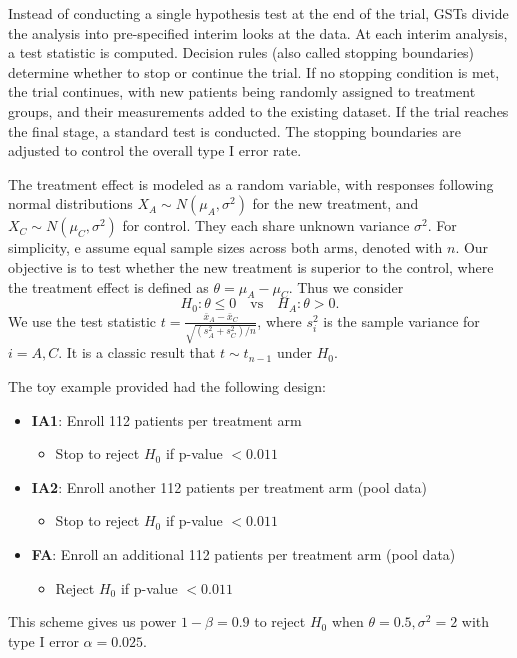 \documentclass[12pt,a4paper]{article}
\begin{document}
Instead of conducting a single hypothesis test at the end of the trial, GSTs divide the analysis into pre-specified interim looks at the data. At each interim analysis, a test statistic is computed. Decision rules (also called stopping boundaries) determine whether to stop or continue the trial. If no stopping condition is met, the trial continues, with new patients being randomly assigned to treatment groups, and their measurements added to the existing dataset. If the trial reaches the final stage, a standard test is conducted. The stopping boundaries are adjusted to control the overall type I error rate. %

The treatment effect is modeled as a random variable, with responses following normal distributions $X_A\sim N(\mu_A, \sigma^2)$ for the new treatment, and $ X_C\sim N(\mu_C, \sigma^2)$ for control. They each share unknown variance $\sigma^2$. For simplicity, e assume equal sample sizes across both arms, denoted with $n$. Our objective is to test whether the new treatment is superior to the control, where the treatment effect is defined as $\theta = \mu_A - \mu_C$. Thus we consider
$$H_0: \theta \leq 0 \quad \text{vs} \quad H_A:\theta > 0.$$  
We use the test statistic $t = \frac{\bar{x}_A - \bar{x}_C}{\sqrt{(s_A^2 + s_C^2)/n}}$, where $s_i^2$ is the sample variance for $i=A,C$. It is a classic result that $t\sim t_{n-1}$ under $H_0$. 

The toy example provided had the following design:
\begin{itemize}
	\item \textbf{IA1}: Enroll 112 patients per treatment arm
	\begin{itemize}
		\item Stop to reject $H_0$ if p-value $<0.011$
	\end{itemize}
	\item \textbf{IA2}: Enroll another 112 patients per treatment arm (pool data)
	\begin{itemize}
		\item Stop to reject $H_0$ if p-value $<0.011$
	\end{itemize}
	\item \textbf{FA}: Enroll an additional 112 patients per treatment arm (pool data)
	\begin{itemize}
		\item Reject $H_0$ if p-value $<0.011$
	\end{itemize}
\end{itemize}
This scheme gives us power $1-\beta = 0.9$ to reject $H_0$ when $\theta = 0.5, \sigma^2=2$ with type I error $\alpha = 0.025$.
\end{document}
